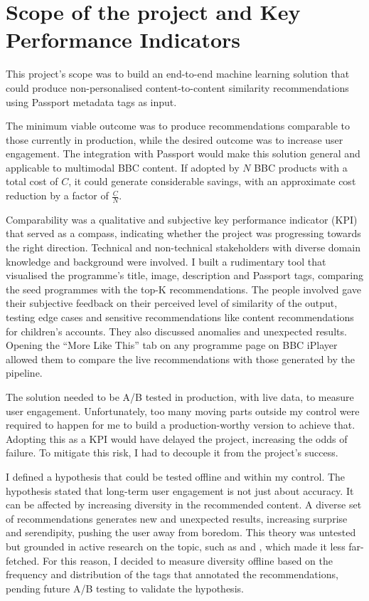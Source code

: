 
\section{Scope of the project and Key Performance Indicators}

This project's scope was to build an end-to-end machine learning solution that could produce non-personalised content-to-content similarity recommendations using Passport metadata tags as input.

The minimum viable outcome was to produce recommendations comparable to those currently in production,
while the desired outcome was to increase user engagement.
The integration with Passport would make this solution general and applicable to multimodal BBC content.
If adopted by $N$ BBC products with a total cost of $C$,
it could generate considerable savings, with an approximate cost reduction by a factor of $\frac{C}{N}$.

Comparability was a qualitative and subjective key performance indicator (KPI) that served as a compass,
indicating whether the project was progressing towards the right direction.
Technical and non-technical stakeholders with diverse domain knowledge and background were involved.
I built a rudimentary tool that visualised the programme's title, image, description and Passport tags,
comparing the seed programmes with the top-K recommendations.
The people involved gave their subjective feedback on their perceived level of similarity of the output,
testing edge cases and sensitive recommendations like content recommendations for children's accounts.
They also discussed anomalies and unexpected results.
Opening the ``More Like This'' tab on any programme page on BBC iPlayer allowed them to compare the live recommendations
with those generated by the pipeline.

The solution needed to be A/B tested in production, with live data, to measure user engagement.
Unfortunately, too many moving parts outside my control were required to happen for me to build a
production-worthy version to achieve that.
Adopting this as a KPI would have delayed the project, increasing the odds of failure.
To mitigate this risk, I had to decouple it from the project's success.

I defined a hypothesis that could be tested offline and within my control.
The hypothesis stated that long-term user engagement is not just about accuracy. It can be affected by increasing diversity in the recommended content.
A diverse set of recommendations generates new and unexpected results, increasing surprise and serendipity, pushing the user away from boredom.
This theory was untested but grounded in active research on the topic, such as \cite{Kaminskas2016DiversitySN} and
\cite{duricic2023beyondaccuracyreviewdiversityserendipity}, which made it less far-fetched.
For this reason, I decided to measure diversity offline based on the frequency and distribution of the tags that annotated the recommendations,
pending future A/B testing to validate the hypothesis.
